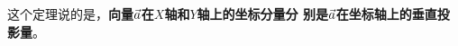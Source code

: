 这个定理说的是，\textbf{向量$\vec{a}$在$X$轴和$Y$轴上的坐标分量分
别是$\vec{a}$在坐标轴上的垂直投影量}。






















































































































